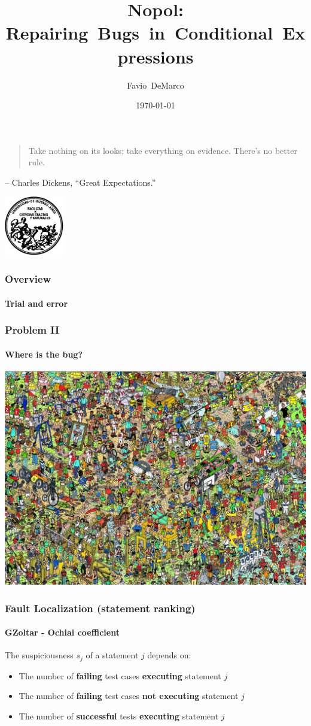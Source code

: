 \documentclass[onlymath]{beamer}
\title[{Nopol: Repairing Bugs in Conditional Expressions}]{Nopol: Repairing~Bugs~in~Conditional~Expressions}
\author[Favio DeMarco]{Favio~DeMarco}
\institute[U.B.A. - INRIA]{Universidad de Buenos Aires - INRIA}
\date{\today}
\begin{document}
  \frame
  {
\begin{quote}
    Take nothing on its looks; take everything on evidence. There's no better rule.
\end{quote}    
– Charles Dickens, ``Great Expectations.''
  }

\frame
  {
  \begin{center}
  \includegraphics[width=7em]{logofcen}
  \end{center}
    \titlepage
  }



\frame
{
    \frametitle{Overview}
    \framesubtitle{Trial and error}
  \begin{center}
  
  \end{center}
}


\begin{frame}
\frametitle{Problem II}
\framesubtitle{Where is the bug?}
  \begin{center}
  \includegraphics[width=.8\paperwidth]{WheresWally}
  \end{center}
\end{frame}

\begin{frame}[fragile]
    \frametitle{Fault Localization (statement ranking)}
      \framesubtitle{GZoltar - Ochiai coefficient}
The suspiciousness $s_j$ of a statement $j$ depends on:
\begin{itemize}
 \item The number of \textbf{failing} test cases \textbf{executing} statement $j$ 
 \item The number of \textbf{failing} test cases \textbf{not executing} statement $j$
 \item The number of \textbf{successful} tests \textbf{executing} statement $j$
\end{itemize}
\end{frame}
\end{document}
